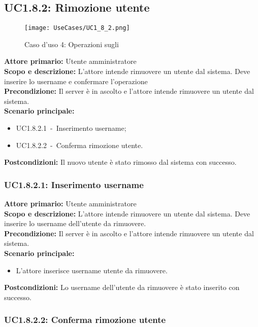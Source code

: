 \documentclass{scalatekids-article}
\begin{document}
\subsection{UC1.8.2: Rimozione utente}

\begin{figure}[H]
  \begin{center}
    \texttt{[image: UseCases/UC1\_8\_2.png]}
    \caption{Caso d'uso 4: Operazioni sugli }
  \end{center}
\end{figure}
\textbf{Attore primario:} Utente amministratore\\
\textbf{Scopo e descrizione:} L'attore intende rimuovere un utente dal sistema. Deve inserire lo username e confermare l'operazione\\
\textbf{Precondizione:} Il server è in ascolto e l'attore intende rimuovere un utente dal sistema.\\
\textbf{Scenario principale:}
\begin{itemize}
\item UC1.8.2.1\ -\ Inserimento username;
\item UC1.8.2.2\ -\ Conferma rimozione utente.
\end{itemize}
\textbf{Postcondizioni:} Il nuovo utente è stato rimosso dal sistema con successo.

\subsubsection{UC1.8.2.1: Inserimento username}

\textbf{Attore primario:} Utente amministratore\\
\textbf{Scopo e descrizione:} L'attore intende rimuovere un utente dal sistema. Deve inserire lo username dell'utente da rimuovere.\\
\textbf{Precondizione:} Il server è in ascolto e l'attore intende rimuovere un utente dal sistema.\\
\textbf{Scenario principale:}
\begin{itemize}
\item L'attore inserisce username utente da rimuovere.
\end{itemize}
\textbf{Postcondizioni:} Lo username dell'utente da rimuovere è stato inserito con successo.

\subsubsection{UC1.8.2.2: Conferma rimozione utente}
\end{document}
